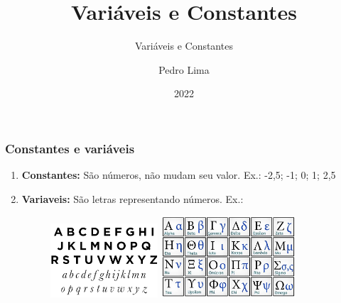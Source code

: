 \documentclass{beamer}
\title{Variáveis e Constantes}
\subtitle{Variáveis e Constantes}
\author{Pedro Lima}
\institute{PLmatemática}
\date{2022}
\begin{document}
    \maketitle  
    
    \begin{frame}
        \frametitle{Constantes e variáveis}
        \begin{enumerate}
            \item \textbf{Constantes:}
            São números, não mudam seu valor.
            \newline
            Ex.: -2,5; -1; 0; 1; 2,5
            \newline
            \item \textbf{Variaveis:}
            São letras representando números.
            \newline
            Ex.:
            \begin{figure}[h]
                \begin{center}
                    \includegraphics[width=4cm]{imagens/Alf_Latim.png}
                    \includegraphics[width=5cm]{imagens/Alf_Grego.jpeg}
                \end{center}
            \end{figure}
        \end{enumerate}
    \end{frame}
    
\end{document}
